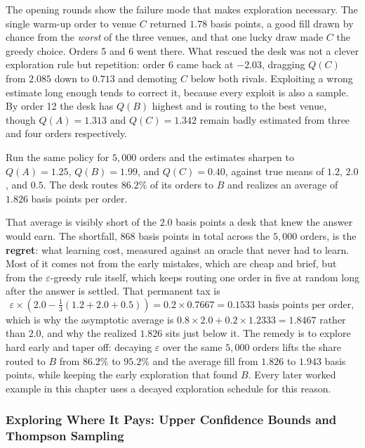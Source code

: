 \documentclass[../ai_in_finance]{subfiles}
\begin{document}
The opening rounds show the failure mode that makes exploration necessary. The single warm-up order to venue $C$ returned $1.78$ basis points, a good fill drawn by chance from the \emph{worst} of the three venues, and that one lucky draw made $C$ the greedy choice. Orders 5 and 6 went there. What rescued the desk was not a clever exploration rule but repetition: order 6 came back at $-2.03$, dragging $Q(C)$ from $2.085$ down to $0.713$ and demoting $C$ below both rivals. Exploiting a wrong estimate long enough tends to correct it, because every exploit is also a sample. By order 12 the desk has $Q(B)$ highest and is routing to the best venue, though $Q(A)=1.313$ and $Q(C)=1.342$ remain badly estimated from three and four orders respectively.

Run the same policy for $5{,}000$ orders and the estimates sharpen to $Q(A)=1.25$, $Q(B)=1.99$, and $Q(C)=0.40$, against true means of $1.2$, $2.0$, and $0.5$. The desk routes $86.2\%$ of its orders to $B$ and realizes an average of $1.826$ basis points per order.

That average is visibly short of the $2.0$ basis points a desk that knew the answer would earn. The shortfall, $868$ basis points in total across the $5{,}000$ orders, is the \textbf{regret}: what learning cost, measured against an oracle that never had to learn. Most of it comes not from the early mistakes, which are cheap and brief, but from the $\varepsilon$-greedy rule itself, which keeps routing one order in five at random long after the answer is settled. That permanent tax is
\begin{equation*}
\varepsilon \times \left(2.0 - \tfrac{1}{3}(1.2 + 2.0 + 0.5)\right) = 0.2 \times 0.7667 = 0.1533 \text{ basis points per order},
\end{equation*}
which is why the asymptotic average is $0.8 \times 2.0 + 0.2 \times 1.2333 = 1.8467$ rather than $2.0$, and why the realized $1.826$ sits just below it. The remedy is to explore hard early and taper off: decaying $\varepsilon$ over the same $5{,}000$ orders lifts the share routed to $B$ from $86.2\%$ to $95.2\%$ and the average fill from $1.826$ to $1.943$ basis points, while keeping the early exploration that found $B$. Every later worked example in this chapter uses a decayed exploration schedule for this reason.

\subsubsection*{Exploring Where It Pays: Upper Confidence Bounds and Thompson Sampling}
\end{document}
